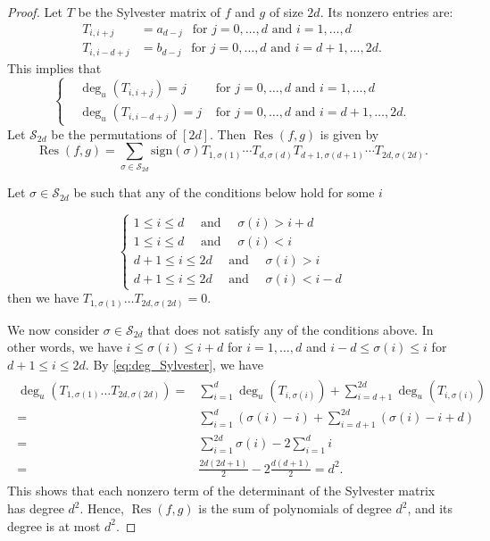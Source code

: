 \documentclass{article}
\numberwithin{theorem}{section}
\theoremstyle{definition}
\theoremstyle{example_contd}
\DeclareMathOperator{\res}{{Res}}
\begin{document}
\begin{proof}
	Let $T$ be the Sylvester matrix of $f$ and $g$ of size $2d$. Its nonzero entries are:
	\begin{align*}
		T_{i,i+j} &= a_{d-j} ~~ \text{ for } j=0,\dots ,d  \mbox{ and } i=1,\dots, d \\
		T_{i,i-d+j} &= b_{d-j} ~~ \text{ for } j=0,\dots ,d  \mbox{ and } i=d+1,\dots, 2d.
	\end{align*} 
	This implies that 
	\begin{equation} \label{eq:deg_Sylvester}
		\left\{
		\begin{split}
			&\deg_u(T_{i,i+j})=j &\mbox{ for } j=0,\dots ,d  \mbox{ and } i=1,\dots, d \\
			&\deg_u(T_{i,i-d+j}) =j &\mbox{ for } j=0,\dots ,d  \mbox{ and } i=d+1,\dots, 2d.
		\end{split} \right.
	\end{equation}
	Let $\mathcal{S}_{2d}$ be the permutations of $[2d]$. Then ${\res}(f,g)$ is given by
	\[\res(f,g)=\sum_{\sigma \in \mathcal{S}_{2d}} \text{sign}(\sigma) T_{1,\sigma(1)}\cdots T_{d,\sigma(d)}T_{d+1,\sigma(d+1)}\cdots T_{2d,\sigma(2d)}.\]

	
	Let $\sigma \in \mathcal{S}_{2d}$ be such that any of the conditions below hold for some $i$ 
	
	\[\left\{ 
	\begin{array}{l}
		1\leq i \leq d \quad \mbox{ and } \quad \sigma(i) > i+d \\
		1\leq i \leq d \quad \mbox{ and } \quad \sigma(i) < i \\
		d+1 \leq i \leq 2d \quad \mbox{ and } \quad \sigma(i) > i \\
		d+1 \leq i \leq 2d \quad \mbox{ and } \quad \sigma(i) < i-d
	\end{array}
	\right.\] 
	then we have $T_{1,\sigma(1)}\dots T_{2d,\sigma(2d)}=0$.
	
	We now consider $\sigma\in\mathcal{S}_{2d}$ that does not satisfy any of the conditions above. In other words, we have $i\leq \sigma(i) \leq i+d$ for $i=1,\dots ,d$ and $i-d\leq \sigma(i) \leq i$ for $d+1\leq i \leq 2d$. By \eqref{eq:deg_Sylvester}, we have 
{\allowdisplaybreaks	\begin{align*}
		\begin{split}
			\deg_u(T_{1,\sigma(1)}\dots T_{2d,\sigma(2d)})= & \sum_{i=1}^{d}\deg_u(T_{i,\sigma(i)}) + \sum_{i=d+1}^{2d}\deg_u(T_{i,\sigma(i)})\\
			=& \sum_{i=1}^d (\sigma(i)-i) + \sum_{i=d+1}^{2d} (\sigma(i)-i+d) \\
			=& \sum_{i=1}^{2d} \sigma(i) -2 \sum_{i=1}^d i  \\
			=& \frac{2d(2d+1)}{2} - 2\frac{d(d+1)}{2}=d^2.
		\end{split}
	\end{align*}
}
	This shows that each nonzero term of the determinant of the Sylvester matrix has degree $d^2$. Hence, $\res(f,g)$ is the sum of polynomials of degree $d^2$, and its degree is at most $d^2$. 
\end{proof}
\end{document}
